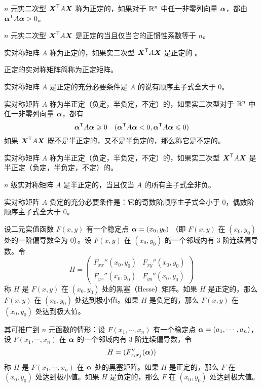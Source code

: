 \begin{definition}
    $n$ 元实二次型 ${\boldsymbol{X}}^\mathsf{T}A\boldsymbol{X}$ 称为正定的，如果对于 $\mathbb{R}^n$ 中任一非零列向量 $\boldsymbol{\alpha}$，都由 ${\boldsymbol{\alpha}}^\mathsf{T}A\boldsymbol{\alpha}>0$。
\end{definition}

\begin{theorem}
    $n$ 元实二次型 ${\boldsymbol{X}}^\mathsf{T}A\boldsymbol{X}$ 是正定的当且仅当它的正惯性系数等于 $n$。
\end{theorem}

\begin{definition}
    实对称矩阵 $A$ 称为正定的，如果实二次型 ${\boldsymbol{X}}^\mathsf{T}A\boldsymbol{X}$ 是正定的 。
\end{definition}

正定的实对称矩阵简称为正定矩阵。

\begin{theorem}
    实对称矩阵 $A$ 是正定的充分必要条件是 $A$ 的说有顺序主子式全大于 $0$。
\end{theorem}

\begin{definition}
    实对称矩阵 $A$ 称为半正定（负定，半负定，不定）的，如果实二次型对于 $\mathbb{R}^n$ 中任一非零列向量 $\boldsymbol{\alpha}$，都有
    $${\boldsymbol{\alpha}}^\mathsf{T}A\boldsymbol{\alpha} \geqslant 0 \quad ({\boldsymbol{\alpha}}^\mathsf{T}A\boldsymbol{\alpha}<0,{\boldsymbol{\alpha}}^\mathsf{T}A\boldsymbol{\alpha}\leqslant 0)$$
    如果 ${\boldsymbol{X}}^\mathsf{T}A\boldsymbol{X}$ 既不是半正定的，又不是半负定的，那么称它是不定的。
\end{definition}

\begin{definition}
    实对称矩阵 $A$ 称为半正定（负定，半负定，不定）的，如果实二次型 ${\boldsymbol{X}}^\mathsf{T}A\boldsymbol{X}$ 是半正定（负定，半负定，不定）的。
\end{definition}

\begin{theorem}
    $n$ 级实对称矩阵 $A$ 是半正定的，当且仅当 $A$ 的所有主子式全非负。
\end{theorem}

\begin{theorem}
    实对称矩阵 $A$ 负定的充分必要条件是：它的奇数阶顺序主子式全小于 $0$，偶数阶顺序主子式全大于 $0$。
\end{theorem}

\begin{theorem}
    设二元实值函数 $F(x,y)$ 有一个稳定点 $\boldsymbol{\alpha}=(x_0,y_0)$ （即 $F(x,y)$ 在 $(x_0,y_0)$ 处的一阶偏导数全为 $0$）。设 $F(x,y)$ 在 $(x_0,y_0)$ 的一个邻域内有 3 阶连续偏导数。令
    $$H = \left(\begin{matrix}
        F_{xx}''(x_0,y_0) & F_{xy}''(x_0,y_0)\\
        F_{yx}''(x_0,y_0) & F_{yy}''(x_0,y_0)
    \end{matrix}\right)$$
    称 $H$ 是 $F(x,y)$ 在 $(x_0,y_0)$ 处的黑塞（Hesse）矩阵。如果 $H$ 是正定的，那么 $F(x,y)$ 在 $(x_0,y_0)$ 处达到极小值。如果 $H$ 是负定的，那么 $F(x,y)$ 在 $(x_0,y_0)$ 处达到极大值。
\end{theorem}

其可推广到 $n$ 元函数的情形：设 $F(x_1,\cdots,x_n)$ 有一个稳定点 $\boldsymbol{\alpha} = (a_1,\cdots,a_n)$，设 $F(x_1,\cdots,x_n)$ 在 $\boldsymbol{\alpha}$ 的一个邻域内有 3 阶连续偏导数，令
$$H = (F_{x_ix_j}''(\boldsymbol{\alpha}))$$
称 $H$ 是 $F(x_1,\cdots,x_n)$ 在 $\boldsymbol{\alpha}$ 处的黑塞矩阵。如果 $H$ 是正定的，那么 $F$ 在 $(x_0,y_0)$ 处达到极小值。如果 $H$ 是负定的，那么 $F$ 在 $(x_0,y_0)$ 处达到极大值。